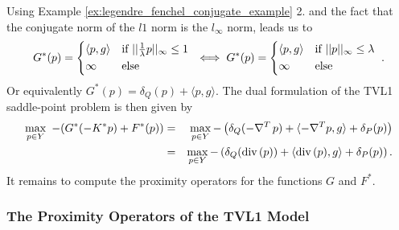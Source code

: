 \documentclass[abstracton]{scrreprt}
\begin{document}
            Using Example \ref{ex:legendre_fenchel_conjugate_example} 2. and the fact that the conjugate norm of the $l1$ norm is the $l_{\infty}$ norm, leads us to
                $$
                    G^{\ast}(p) =
                        \begin{dcases*}
                            \langle p, g \rangle & \textnormal{if $||\frac{1}{\lambda}p||_{\infty} \le 1$} \\
                            \infty & \textnormal{else}
                        \end{dcases*} \iff
                    G^{\ast}(p) =
                        \begin{dcases*}
                            \langle p, g \rangle & \textnormal{if $||p||_{\infty} \le \lambda$} \\
                            \infty & \textnormal{else}
                        \end{dcases*}.
                $$
            Or equivalently $G^{\ast}(p) = \delta_{Q}(p) + \langle p, g \rangle$. The dual formulation of the TVL1 saddle-point problem is then given by
                \begin{eqnarray}
                    \max_{p \in Y}\,\, -(G^{\ast}(-K^{\ast}p) + F^{\ast}(p)) &=& \max_{p \in Y} -\left( \delta_{Q}(-\nabla^{T}\,p) + \langle -\nabla^{T}p, g \rangle + \delta_{P}(p) \right) \notag \\
                    &=& \max_{p \in Y} -\left( \delta_{Q}(\textnormal{div}\,(p)) + \langle \textnormal{div}\,(p), g \rangle + \delta_{P}(p) \right). \notag
                \end{eqnarray}
            It remains to compute the proximity operators for the functions $G$ and $F^{\ast}$.
        

        \subsubsection{The Proximity Operators of the TVL1 Model} %
        \label{ssub:the_proximity_operators_of_the_tvl1_model}
            
\end{document}
